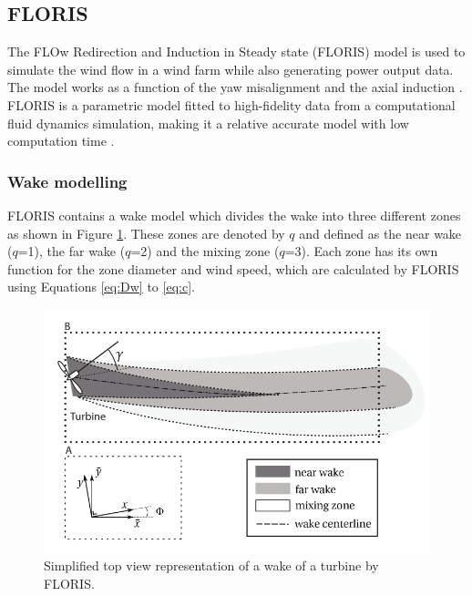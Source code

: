 
\subsection{FLORIS} \label{sec:floris} The FLOw Redirection and Induction in Steady state (FLORIS) model is used to simulate the wind flow in a wind farm while also generating power output data. The model works as a function of the yaw misalignment and the axial induction \cite{Gebraad2016}. FLORIS is a parametric model fitted to high-fidelity data from a computational fluid dynamics simulation, making it a relative accurate model with low computation time \cite{Dijk2016}. 

\subsubsection{Wake modelling}
\label{wakemodel}
FLORIS contains a wake model which divides the wake into three different zones as shown in Figure \ref{fig:wake}. These zones are denoted by $q$ and defined as the near wake ($q$=1), the far wake ($q$=2) and the mixing zone ($q$=3). Each zone has its own function for the zone diameter and wind speed, which are calculated by FLORIS using Equations \ref{eq:Dw} to \ref{eq:c}. 


\begin{figure}
  	\includegraphics[width=\linewidth]{./Figures/WakeFLORIS.png}
  	\caption{Simplified top view representation of a wake of a turbine by FLORIS\cite{Gebraad2016}.}
	\label{fig:wake}
\end{figure}

